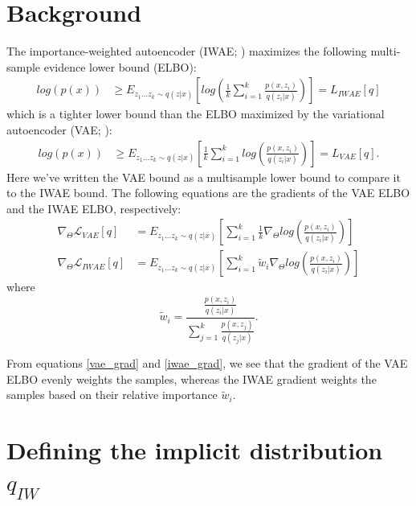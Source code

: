 \documentclass{article} %
\newcommand{\eqname}[1]{\tag*{#1}}
\begin{document}
\section{Background}
The importance-weighted autoencoder (IWAE; \cite{burda2015importance}) maximizes the following multi-sample evidence lower bound (ELBO): 
\begin{align} 
    log(p(x)) &
    \geq E_{z_{1}...z_{k} \sim q(z|x)} \left[log\left(  \frac{1}{k}  \sum_{i=1}^k \frac{p(x,z_i)}{q(z_i|x)}  \right)  \right] = L_{IWAE}[q] \label{iwae_elbo}  \eqname{(IWAE ELBO)}
\end{align}
which is a tighter lower bound than the ELBO maximized by the variational autoencoder (VAE; \cite{vae}):
\begin{align}
    log(p(x)) & \geq E_{z_{1}...z_{k} \sim q(z|x)} \left[  \frac{1}{k}\sum_{i=1}^k log\left(\frac{p(x,z_i)}{q(z_i|x)}  \right)  \right] = L_{VAE}[q]. \label{vae_elbo} \eqname{(VAE ELBO)}
\end{align}
Here we've written the VAE bound as a multisample lower bound to compare it to the IWAE bound. The following equations are the gradients of the VAE ELBO and the IWAE ELBO, respectively:
\begin{align} 
    \nabla_{\Theta} \mathcal{L}_{VAE}[q] &= E_{z_{1}...z_{k} \sim q(z|x)} \left[   \sum_{i=1}^k \frac{1}{k} \nabla_{\Theta} log\left(\frac{p(x,z_i)}{q(z_i|x)}  \right)  \right] \label{vae_grad} \\
    \nabla_{\Theta} \mathcal{L}_{IWAE}[q] &= E_{z_{1}...z_{k} \sim q(z|x)} \left[  \sum_{i=1}^k \tilde{w}_i \nabla_{\Theta} log\left(\frac{p(x,z_i)}{q(z_i|x)}  \right)  \right] \label{iwae_grad}
\end{align}
where $$\tilde{w}_i = \frac{\frac{p(x,z_i)}{q(z_i|x)}}{\sum_{j=1}^k \frac{p(x,z_j)}{q(z_j|x)}}.$$

From equations \eqref{vae_grad} and \eqref{iwae_grad}, we see that the gradient of the VAE ELBO evenly weights the samples, whereas the IWAE gradient weights the samples based on their relative importance $\tilde{w}_i$.






\section{Defining the implicit distribution \texorpdfstring{$q_{IW}$}{}}
\end{document}
